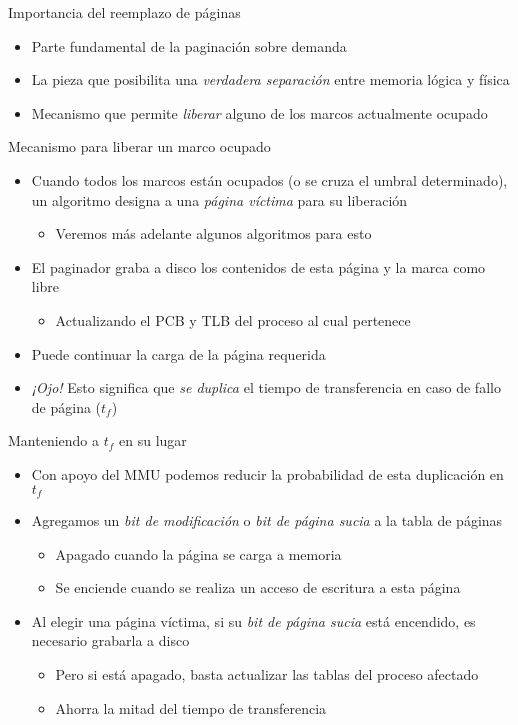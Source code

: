 \documentclass[presentation]{beamer}
\begin{document}
\begin{frame}[label={sec:orgee42ebb}]{Importancia del reemplazo de páginas}
\begin{itemize}
\item Parte fundamental de la paginación sobre demanda
\item La pieza que posibilita una \emph{verdadera separación} entre memoria
lógica y física
\item Mecanismo que permite \emph{liberar} alguno de los marcos actualmente
ocupado
\end{itemize}
\end{frame}

\begin{frame}[label={sec:orgc304c45}]{Mecanismo para liberar un marco ocupado}
\begin{itemize}
\item Cuando todos los marcos están ocupados (o se cruza el umbral
determinado), un algoritmo designa a una \emph{página víctima} para su
liberación
\begin{itemize}
\item Veremos más adelante algunos algoritmos para esto
\end{itemize}
\item El paginador graba a disco los contenidos de esta página y la marca
como libre
\begin{itemize}
\item Actualizando el PCB y TLB del proceso al cual pertenece
\end{itemize}
\item Puede continuar la carga de la página requerida
\item \emph{¡Ojo!} Esto significa que \emph{se duplica} el tiempo de transferencia
en caso de fallo de página (\(t_f\))
\end{itemize}
\end{frame}

\begin{frame}[label={sec:org3297e38}]{Manteniendo a \(t_f\) en su lugar}
\begin{itemize}
\item Con apoyo del MMU podemos reducir la probabilidad de esta
duplicación en \(t_f\)
\item Agregamos un \emph{bit de modificación} o \emph{bit de página sucia} a la
tabla de páginas
\begin{itemize}
\item Apagado cuando la página se carga a memoria
\item Se enciende cuando se realiza un acceso de escritura a esta página
\end{itemize}
\item Al elegir una página víctima, si su \emph{bit de página sucia} está
encendido, es necesario grabarla a disco
\begin{itemize}
\item Pero si está apagado, basta actualizar las tablas del proceso
afectado
\item Ahorra la mitad del tiempo de transferencia
\end{itemize}
\end{itemize}
\end{frame}
\end{document}
